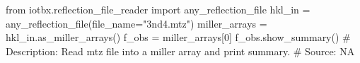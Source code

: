 from iotbx.reflection_file_reader import any_reflection_file
hkl_in = any_reflection_file(file_name="3nd4.mtz")
miller_arrays = hkl_in.as_miller_arrays()
f_obs = miller_arrays[0]
f_obs.show_summary()
# Description:  Read mtz file into a miller array and print summary.
# Source:  NA

